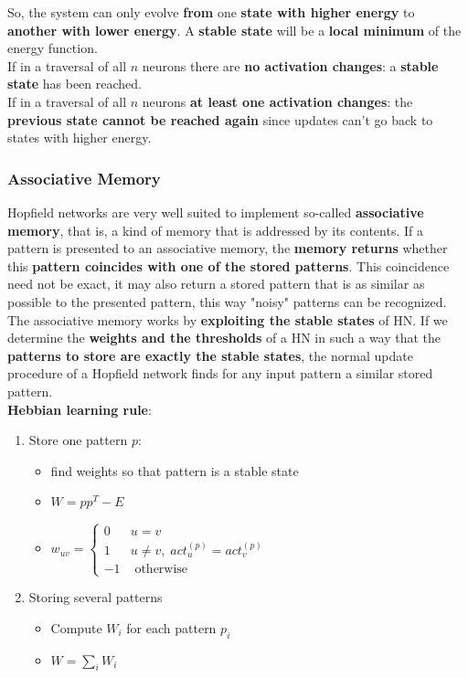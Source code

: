 So, the system can only evolve \textbf{from} one \textbf{state with higher energy} to \textbf{another with lower energy}. A \textbf{stable state} will be a \textbf{local minimum} of the energy function.\\

If in a traversal of all $n$ neurons there are \textbf{no activation changes}: a \textbf{stable state} has been reached.\\
If in a traversal of all $n$ neurons \textbf{at least one activation changes}: the \textbf{previous state cannot be reached again} since updates can't go back to states with higher energy.\\

\newpage

\subsubsection{Associative Memory}
Hopfield networks are very well suited to implement so-called \textbf{associative memory}, that is, a kind of memory that is addressed by its contents. If a pattern is presented to an associative memory, the \textbf{memory returns} whether this \textbf{pattern coincides with one of the stored patterns}. This coincidence need not be exact, it may also return a stored pattern that is as similar as possible to the presented pattern, this way "noisy" patterns can be recognized.\\

The associative memory works by \textbf{exploiting the stable states} of HN. If we determine the \textbf{weights and the thresholds} of a HN in such a way that the \textbf{patterns to store are exactly the stable states}, the normal update procedure of a Hopfield network finds for any input pattern a similar stored pattern.\\

\textbf{Hebbian learning rule}:
\begin{enumerate}
	\item Store one pattern $p$:
	\begin{itemize}
		\item find weights so that pattern is a stable state
		\item $ W = pp^T - E $
		\item $ w_{uv} = \begin{cases}
			0 & u = v \\
			1 & u \neq v, \; act_u^{(p)} = act_v^{(p)} \\
			-1 & \text{ otherwise}
		\end{cases}$
	\end{itemize}
	\nn
	
	\item Storing several patterns
	\begin{itemize}
		\item Compute $W_i$ for each pattern $p_i$
		\item $W = \sum_i W_i$
	\end{itemize}
\end{enumerate}

